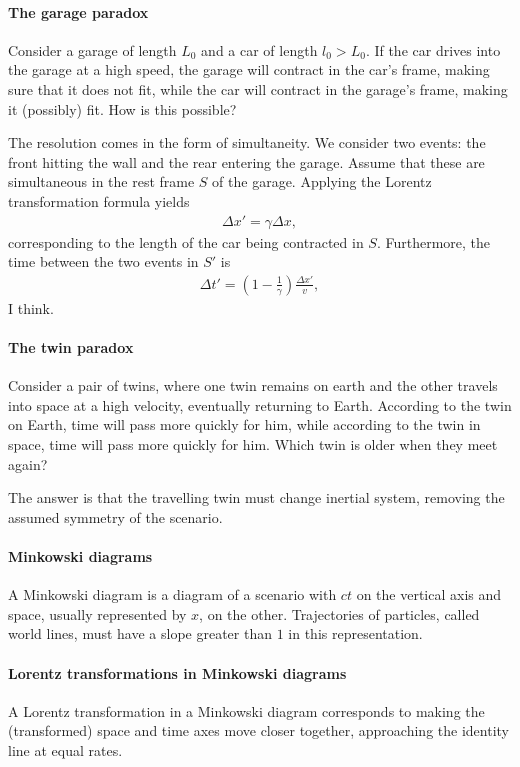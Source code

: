 \paragraph{The garage paradox}
Consider a garage of length $L_{0}$ and a car of length $l_{0} > L_{0}$. If the car drives into the garage at a high speed, the garage will contract in the car's frame, making sure that it does not fit, while the car will contract in the garage's frame, making it (possibly) fit. How is this possible?

The resolution comes in the form of simultaneity. We consider two events: the front hitting the wall and the rear entering the garage. Assume that these are simultaneous in the rest frame $S$ of the garage. Applying the Lorentz transformation formula yields
\begin{align*}
	\Delta x' = \gamma\Delta x,
\end{align*}
corresponding to the length of the car being contracted in $S$. Furthermore, the time between the two events in $S'$ is
\begin{align*}
	\Delta t' = (1 - \frac{1}{\gamma})\frac{\Delta x'}{v},
\end{align*}
I think.

\paragraph{The twin paradox}
Consider a pair of twins, where one twin remains on earth and the other travels into space at a high velocity, eventually returning to Earth. According to the twin on Earth, time will pass more quickly for him, while according to the twin in space, time will pass more quickly for him. Which twin is older when they meet again?

The answer is that the travelling twin must change inertial system, removing the assumed symmetry of the scenario.

\paragraph{Minkowski diagrams}
A Minkowski diagram is a diagram of a scenario with $ct$ on the vertical axis and space, usually represented by $x$, on the other. Trajectories of particles, called world lines, must have a slope greater than $1$ in this representation.

\paragraph{Lorentz transformations in Minkowski diagrams}
A Lorentz transformation in a Minkowski diagram corresponds to making the (transformed) space and time axes move closer together, approaching the identity line at equal rates.